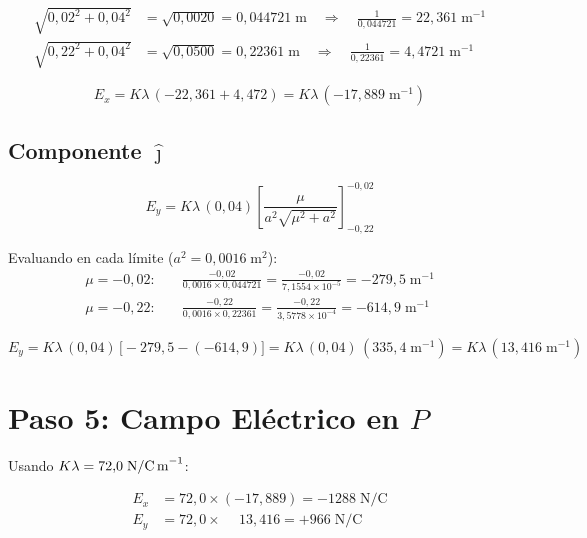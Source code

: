 \documentclass[12pt,letterpaper]{article}
\begin{document}
\begin{align*}
    \sqrt{0{,}02^2 + 0{,}04^2} &= \sqrt{0{,}0020} = 0{,}044721\;\text{m}
    \quad\Rightarrow\quad \frac{1}{0{,}044721} = 22{,}361\;\text{m}^{-1}\\[4pt]
    \sqrt{0{,}22^2 + 0{,}04^2} &= \sqrt{0{,}0500} = 0{,}22361\;\text{m}
    \quad\Rightarrow\quad \frac{1}{0{,}22361} = 4{,}4721\;\text{m}^{-1}
\end{align*}

\begin{equation*}
    E_x = K\lambda\,(-22{,}361 + 4{,}472) = K\lambda\,(-17{,}889\;\text{m}^{-1})
\end{equation*}

\subsection*{Componente $\hat{\jmath}$}

\begin{equation*}
    E_y = K\lambda\,(0{,}04)\left[\frac{\mu}{a^2\sqrt{\mu^2 + a^2}}\right]_{-0{,}22}^{-0{,}02}
\end{equation*}

Evaluando en cada l\'imite ($a^2 = 0{,}0016\;\text{m}^2$):
\begin{align*}
    \mu = -0{,}02:\quad
    &\frac{-0{,}02}{0{,}0016\times 0{,}044721}
    = \frac{-0{,}02}{7{,}1554\times10^{-5}}
    = -279{,}5\;\text{m}^{-1}\\[4pt]
    \mu = -0{,}22:\quad
    &\frac{-0{,}22}{0{,}0016\times 0{,}22361}
    = \frac{-0{,}22}{3{,}5778\times10^{-4}}
    = -614{,}9\;\text{m}^{-1}
\end{align*}

\begin{equation*}
    E_y = K\lambda\,(0{,}04)\,\bigl[-279{,}5 - (-614{,}9)\bigr]
        = K\lambda\,(0{,}04)\,(335{,}4\;\text{m}^{-1})
        = K\lambda\,(13{,}416\;\text{m}^{-1})
\end{equation*}

\section*{Paso 5: Campo El\'ectrico en $P$}

Usando $K\lambda = 72{,}0\;\text{N/C\,m}^{-1}$:

\begin{align*}
    E_x &= 72{,}0 \times (-17{,}889) = -1288\;\text{N/C}\\
    E_y &= 72{,}0 \times \phantom{-}13{,}416 = +966\;\text{N/C}
\end{align*}
\end{document}
